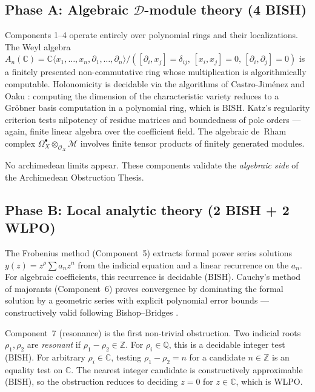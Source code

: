 \documentclass[11pt,a4paper]{article}
\theoremstyle{plain}
\theoremstyle{definition}
\newcommand{\BISH}{\textsf{BISH}}
\newcommand{\WLPO}{\textsf{WLPO}}
\newcommand{\Z}{\mathbb{Z}}
\newcommand{\Q}{\mathbb{Q}}
\newcommand{\C}{\mathbb{C}}
\begin{document}
\subsection{Phase A: Algebraic $\mathcal{D}$-module theory (4 \BISH)}

Components 1--4 operate entirely over polynomial rings and their localizations.
The Weyl algebra $A_n(\C) = \C\langle x_1, \ldots, x_n, \partial_1, \ldots, \partial_n \rangle / ([\partial_i, x_j] = \delta_{ij},\, [x_i, x_j] = 0,\, [\partial_i, \partial_j] = 0)$ is a finitely presented non-commutative ring whose multiplication is algorithmically computable.
Holonomicity is decidable via the algorithms of Castro-Jim\'enez \cite{Castro1987} and Oaku \cite{Oaku1997}: computing the dimension of the characteristic variety reduces to a Gr\"obner basis computation in a polynomial ring, which is \BISH.
Katz's regularity criterion \cite{Katz1970} tests nilpotency of residue matrices and boundedness of pole orders --- again, finite linear algebra over the coefficient field.
The algebraic de~Rham complex $\Omega^\bullet_X \otimes_{\mathcal{O}_X} \mathcal{M}$ involves finite tensor products of finitely generated modules.

No archimedean limits appear.
These components validate the \emph{algebraic side} of the Archimedean Obstruction Thesis.

\subsection{Phase B: Local analytic theory (2 \BISH{} + 2 \WLPO)}

The Frobenius method (Component~5) extracts formal power series solutions $y(z) = z^\rho \sum a_n z^n$ from the indicial equation and a linear recurrence on the $a_n$.
For algebraic coefficients, this recurrence is decidable (\BISH).
Cauchy's method of majorants (Component~6) proves convergence by dominating the formal solution by a geometric series with explicit polynomial error bounds --- constructively valid following Bishop--Bridges \cite{BishopBridges1985}.

Component~7 (resonance) is the first non-trivial obstruction.
Two indicial roots $\rho_1, \rho_2$ are \emph{resonant} if $\rho_1 - \rho_2 \in \Z$.
For $\rho_i \in \Q$, this is a decidable integer test (\BISH).
For arbitrary $\rho_i \in \C$, testing $\rho_1 - \rho_2 = n$ for a candidate $n \in \Z$ is an equality test on $\C$.
The nearest integer candidate is constructively approximable (\BISH), so the obstruction reduces to deciding $z = 0$ for $z \in \C$, which is \WLPO.
\end{document}
